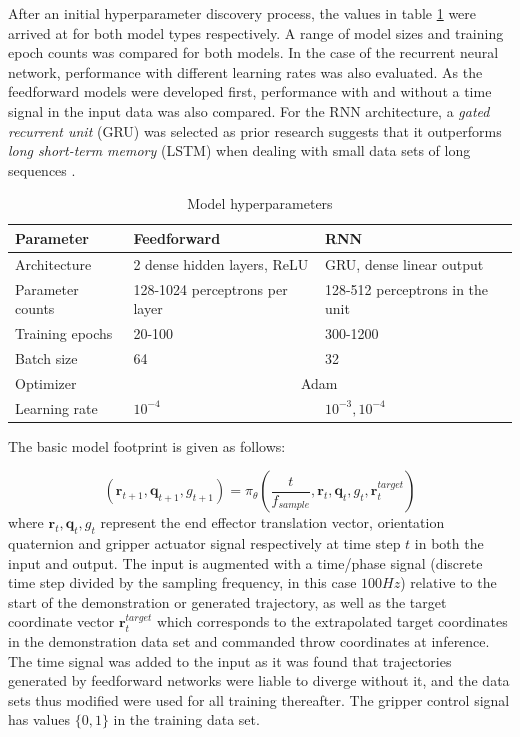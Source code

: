\documentclass{article}
\begin{document}
After an initial hyperparameter discovery process, the values in table \ref{tab:table1} were arrived at for both model types respectively. A range of model sizes and training epoch counts was compared for both models. In the case of the recurrent neural network, performance with different learning rates was also evaluated. As the feedforward models were developed first, performance with and without a time signal in the input data was also compared. For the RNN architecture, a \emph{gated recurrent unit} (GRU) was selected as prior research suggests that it outperforms \emph{long short-term memory} (LSTM) when dealing with small data sets of long sequences \citep{yang2020lstm}.

\begin{table}
	\caption{Model hyperparameters}
	\centering
	\begin{tabular}{lll}
		\toprule
		Parameter & Feedforward & RNN \\
		\midrule
		Architecture & 2 dense hidden layers, ReLU  & GRU, dense linear output   \\
		Parameter counts     & 128-1024 perceptrons per layer & 128-512 perceptrons in the unit \\
		Training epochs     & 20-100       & 300-1200  \\
		Batch size    & 64       & 32  \\
		Optimizer    & \multicolumn{2}{c}{Adam}  \\
		Learning rate    & $10^{-4}$       & $10^{-3}, 10^{-4}$   \\
		\bottomrule
	\end{tabular}
	\label{tab:table1}
\end{table}

The basic model footprint is given as follows:

\begin{equation}
	(\boldsymbol{r}_{t+1}, \boldsymbol{q}_{t+1}, g_{t+1}) = \pi_{\theta}\left(\frac{t}{f_{sample}}, \boldsymbol{r}_{t}, \boldsymbol{q}_{t}, g_{t}, \boldsymbol{r}^{target}_t \right)
\end{equation}
where $\boldsymbol{r}_{t}, \boldsymbol{q}_{t}, g_{t}$ represent the end effector translation vector, orientation quaternion and gripper actuator signal respectively at time step $t$ in both the input and output. The input is augmented with a time/phase signal (discrete time step divided by the sampling frequency, in this case $100Hz$) relative to the start of the demonstration or generated trajectory, as well as the target coordinate vector $\boldsymbol{r}^{target}_t$ which corresponds to the extrapolated target coordinates in the demonstration data set and commanded throw coordinates at inference. The time signal was added to the input as it was found that trajectories generated by feedforward networks were liable to diverge without it, and the data sets thus modified were used for all training thereafter. The gripper control signal has values $\lbrace 0,1 \rbrace$ in the training data set.
\end{document}
